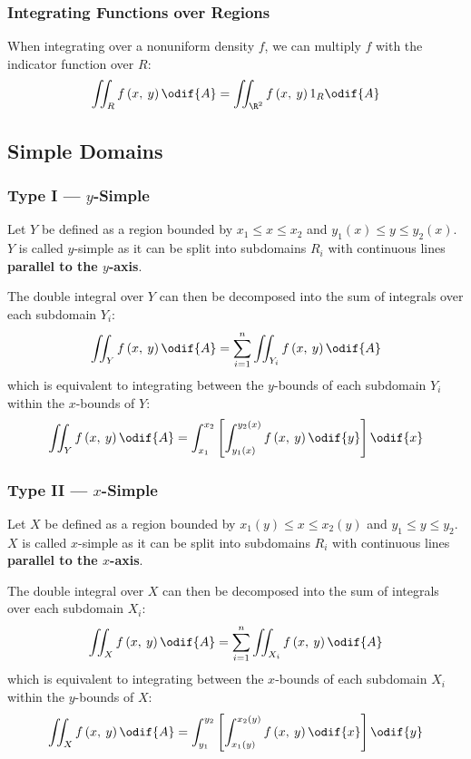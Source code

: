 \documentclass{article}
\begin{document}
\subsubsection{Integrating Functions over Regions}
When integrating over a nonuniform density \(f\), we can multiply \(f\)
with the indicator function over \(R\):
\begin{equation*}
    \iint_R f\left( x,\: y \right) \odif{A} = \iint_{\R^2} f\left( x,\: y \right) 1_R \odif{A}
\end{equation*}
\subsection{Simple Domains}
\subsubsection{Type I --- \texorpdfstring{\(y\)}{y}-Simple}
Let \(Y\) be defined as a region bounded by
\(x_1 \leqslant x \leqslant x_2\) and
\(y_1\left( x \right) \leqslant y \leqslant y_2\left( x \right)\).
\(Y\) is called \(y\)-simple as it can be split into subdomains \(R_i\)
with continuous lines \textbf{parallel to the \(y\)-axis}.

The double integral over \(Y\) can then be decomposed into the sum of
integrals over each subdomain \(Y_i\):
\begin{equation*}
    \iint_Y f\left( x,\: y \right) \odif{A} = \sum_{i = 1}^n \iint_{Y_i} f\left( x,\: y \right) \odif{A}
\end{equation*}
which is equivalent to integrating between the \(y\)-bounds of each
subdomain \(Y_i\) within the \(x\)-bounds of \(Y\):
\begin{equation*}
    \iint_Y f\left( x,\: y \right) \odif{A} = \int_{x_1}^{x_2} \left[ \int_{y_1\left( x \right)}^{y_2\left( x \right)} f\left( x,\: y \right) \odif{y} \right] \odif{x}
\end{equation*}
\subsubsection{Type II --- \texorpdfstring{\(x\)}{x}-Simple}
Let \(X\) be defined as a region bounded by
\(x_1\left( y \right) \leqslant x \leqslant x_2\left( y \right)\) and
\(y_1 \leqslant y \leqslant y_2\).
\(X\) is called \(x\)-simple as it can be split into subdomains \(R_i\)
with continuous lines \textbf{parallel to the \(x\)-axis}.

The double integral over \(X\) can then be decomposed into the sum of
integrals over each subdomain \(X_i\):
\begin{equation*}
    \iint_X f\left( x,\: y \right) \odif{A} = \sum_{i = 1}^n \iint_{X_i} f\left( x,\: y \right) \odif{A}
\end{equation*}
which is equivalent to integrating between the \(x\)-bounds of each
subdomain \(X_i\) within the \(y\)-bounds of \(X\):
\begin{equation*}
    \iint_X f\left( x,\: y \right) \odif{A} = \int_{y_1}^{y_2} \left[ \int_{x_1\left( y \right)}^{x_2\left( y \right)} f\left( x,\: y \right) \odif{x} \right] \odif{y}
\end{equation*}
\end{document}
